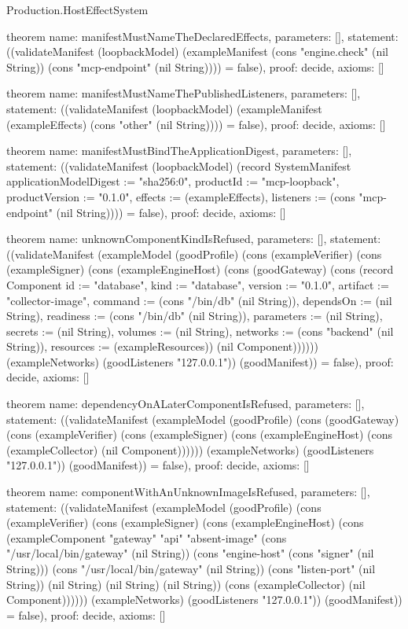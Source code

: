 \begin{lexlean}{Production.HostEffectSystem}
\begin{semanticmodule}
theorem{
  name: manifestMustNameTheDeclaredEffects,
  parameters: [],
  statement: ((validateManifest (loopbackModel) (exampleManifest (cons "engine.check" (nil String)) (cons "mcp-endpoint" (nil String)))) = false),
  proof: decide{},
  axioms: []
}

theorem{
  name: manifestMustNameThePublishedListeners,
  parameters: [],
  statement: ((validateManifest (loopbackModel) (exampleManifest (exampleEffects) (cons "other" (nil String)))) = false),
  proof: decide{},
  axioms: []
}

theorem{
  name: manifestMustBindTheApplicationDigest,
  parameters: [],
  statement: ((validateManifest (loopbackModel) (record SystemManifest {applicationModelDigest := "sha256:0", productId := "mcp-loopback", productVersion := "0.1.0", effects := (exampleEffects), listeners := (cons "mcp-endpoint" (nil String))})) = false),
  proof: decide{},
  axioms: []
}

theorem{
  name: unknownComponentKindIsRefused,
  parameters: [],
  statement: ((validateManifest (exampleModel (goodProfile) (cons (exampleVerifier) (cons (exampleSigner) (cons (exampleEngineHost) (cons (goodGateway) (cons (record Component {id := "database", kind := "database", version := "0.1.0", artifact := "collector-image", command := (cons "/bin/db" (nil String)), dependsOn := (nil String), readiness := (cons "/bin/db" (nil String)), parameters := (nil String), secrets := (nil String), volumes := (nil String), networks := (cons "backend" (nil String)), resources := (exampleResources)}) (nil Component)))))) (exampleNetworks) (goodListeners "127.0.0.1")) (goodManifest)) = false),
  proof: decide{},
  axioms: []
}

theorem{
  name: dependencyOnALaterComponentIsRefused,
  parameters: [],
  statement: ((validateManifest (exampleModel (goodProfile) (cons (goodGateway) (cons (exampleVerifier) (cons (exampleSigner) (cons (exampleEngineHost) (cons (exampleCollector) (nil Component)))))) (exampleNetworks) (goodListeners "127.0.0.1")) (goodManifest)) = false),
  proof: decide{},
  axioms: []
}

theorem{
  name: componentWithAnUnknownImageIsRefused,
  parameters: [],
  statement: ((validateManifest (exampleModel (goodProfile) (cons (exampleVerifier) (cons (exampleSigner) (cons (exampleEngineHost) (cons (exampleComponent "gateway" "api" "absent-image" (cons "/usr/local/bin/gateway" (nil String)) (cons "engine-host" (cons "signer" (nil String))) (cons "/usr/local/bin/gateway" (nil String)) (cons "listen-port" (nil String)) (nil String) (nil String) (nil String)) (cons (exampleCollector) (nil Component)))))) (exampleNetworks) (goodListeners "127.0.0.1")) (goodManifest)) = false),
  proof: decide{},
  axioms: []
}


\end{semanticmodule}
\end{lexlean}
